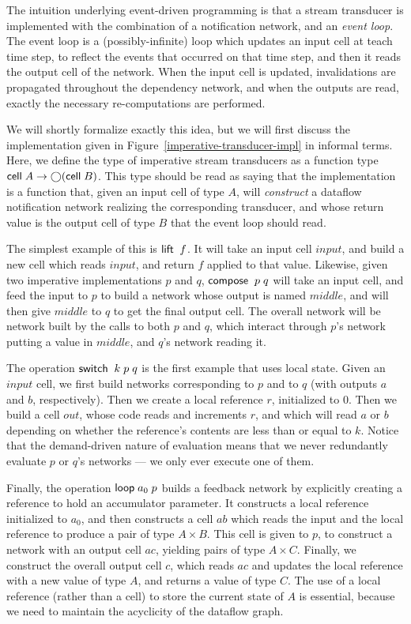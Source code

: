 The intuition underlying event-driven programming is that a stream
transducer is implemented with the combination of a notification
network, and an \emph{event loop}.  The event loop is a
(possibly-infinite) loop which updates an input cell at teach time
step, to reflect the events that occurred on that time step, and then
it reads the output cell of the network. When the input cell is
updated, invalidations are propagated throughout the dependency
network, and when the outputs are read, exactly the necessary
re-computations are performed.

We will shortly formalize exactly this idea, but we will first discuss
the implementation given in
Figure~\ref{imperative-transducer-impl} in informal terms. Here,
we define the type of imperative stream transducers as a function type
$\mathsf{cell}\;{A} \to \bigcirc{(\mathsf{cell}\;{B})}$. This type should be read as
saying that the implementation is a function that, given an input cell
of type $A$, will \emph{construct} a dataflow notification network
realizing the corresponding transducer, and whose return value is the
output cell of type $B$ that the event loop should read. 

The simplest example of this is $\mathsf{lift}\;\;f$. It will take an input
cell $input$, and build a new cell which reads $input$, and return $f$
applied to that value. Likewise, given two imperative implementations $p$
and $q$, $\mathsf{compose}\;\;p\;q$ will take an input cell, and feed the
input to $p$ to build a network whose output is named $middle$, and
will then give $middle$ to $q$ to get the final output cell. The
overall network will be network built by the calls to both $p$ and
$q$, which interact through $p$'s network putting a value in $middle$,
and $q$'s network reading it.

The operation $\mathsf{switch}\;\;k\;p\;q$ is the first example that uses 
local state. Given an $input$ cell, we first build networks corresponding
to $p$ and to $q$ (with outputs $a$ and $b$, respectively). Then we
create a local reference $r$, initialized to $0$. Then we build a cell $out$,
whose code reads and increments $r$, and which will read $a$ or $b$ depending
on whether the reference's contents are less than or equal to $k$. Notice
that the demand-driven nature of evaluation means that we never redundantly
evaluate $p$ or $q$'s networks --- we only ever execute one of them. 

Finally, the operation $\mathsf{loop}\; a_0\;p$ builds a feedback network by
explicitly creating a reference to hold an accumulator parameter. It
constructs a local reference initialized to $a_0$, and then constructs
a cell $ab$ which reads the input and the local reference to produce a
pair of type $A \times B$. This cell is given to $p$, to construct a
network with an output cell $ac$, yielding pairs of type $A \times
C$. Finally, we construct the overall output cell $c$, which reads
$ac$ and updates the local reference with a new value of type $A$, and
returns a value of type $C$. The use of a local reference (rather than
a cell) to store the current state of $A$ is essential, because we need
to maintain the acyclicity of the dataflow graph. 

